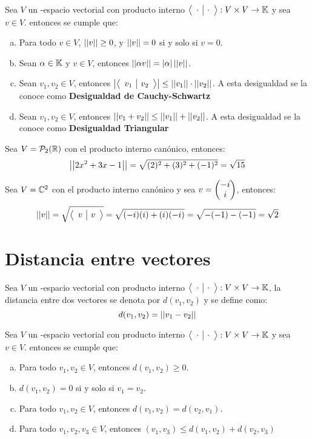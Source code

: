 \begin{theorem}
 Sea $V$ un \dobleK-espacio vectorial con producto interno $\left\langle \begin{array}{c|c} \cdot & \cdot \end{array}\right\rangle: V \times V \to \mathbb{K}$ y sea $v \in V$. entonces se cumple que:
 \begin{enumerate}[a.]
     \item Para todo $v \in V$, $\left|\left| v \right|\right| \geq 0$,  y $\left|\left| v \right|\right| = 0$ si y solo si $v = 0$.
     \item Sean $\alpha \in \mathbb{K}$ y $v \in V$, entonces $\left|\left| \alpha v \right|\right| = |\alpha| \left|\left| v \right|\right|$.
     \item Sean $v_1, v_2 \in V$, entonces $\left|\left\langle \begin{array}{c|c} v_1 & v_2 \end{array}\right\rangle\right| \leq \left|\left| v_1 \right|\right| \cdot \left|\left| v_2 \right|\right|$. A esta desigualdad se la conoce como \textbf{Desigualdad de Cauchy-Schwartz}
     \item Sean $v_1, v_2 \in V$, entonces $\left|\left| v_1 + v_2 \right|\right| \leq \left|\left| v_1 \right|\right| + \left|\left| v_2 \right|\right|$. A esta desigualdad se la conoce como \textbf{Desigualdad Triangular}
 \end{enumerate}
\end{theorem}

\begin{ejemplo}
    Sea $V = \mathcal{P}_2(\mathbb{R})$ con el producto interno canónico, entonces:
    $$\left|\left| 2x^2 + 3x -1 \right|\right| = \sqrt{(2)^2 + (3)^2 + (-1)^2} = \sqrt{15}$$
\end{ejemplo}

\begin{ejemplo}
    Sea $V = \mathbb{C}^2$ con el producto interno canónico y sea $v = \begin{pmatrix} -i\\ i\\ \end{pmatrix} $, entonces:
    $$\left|\left| v \right|\right| = \sqrt{\left\langle \begin{array}{c|c} v & v \end{array}\right\rangle} = \sqrt{(-i)(i) + (i)(-i)} = \sqrt{-(-1) -(-1)} = \sqrt{2}$$
    
\end{ejemplo}
\section{Distancia entre vectores}
\begin{dfn}
Sea $V$ un \dobleK-espacio vectorial con producto interno $\left\langle \begin{array}{c|c} \cdot & \cdot \end{array}\right\rangle: V \times V \to \mathbb{K}$, la distancia entre dos vectores se denota por $d(v_1, v_2)$ y se define como:
$$d(v_1,v_2) = \left|\left| v_1 - v_2 \right|\right|$$
\end{dfn}

\begin{theorem}
 Sea $V$ un \dobleK-espacio vectorial con producto interno $\left\langle \begin{array}{c|c} \cdot & \cdot \end{array}\right\rangle: V \times V \to \mathbb{K}$ y sea $v \in V$. entonces se cumple que:
 \begin{enumerate}[a.]
     \item Para todo $v_1, v_2 \in V$, entonces $d(v_1,v_2) \geq 0$.
     \item $d(v_1, v_2) = 0$ si y solo si $v_1 = v_2$.
     \item Para todo $v_1, v_2 \in V$, entonces $d(v_1, v_2) = d(v_2, v_1)$.
     \item Para todo $v_1, v_2, v_3 \in V$, entonces $(v_1, v_3) \leq d(v_1, v_2) + d(v_2, v_3)$
 \end{enumerate}
\end{theorem}

